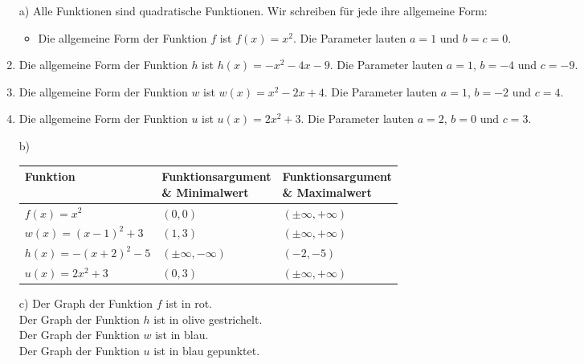 \documentclass[12pt]{article}
\begin{document}
\begin{solution}
\begin{enumerate}
\item[a)] Alle Funktionen sind quadratische Funktionen. Wir schreiben für jede ihre allgemeine Form:
\begin{itemize}
\item Die allgemeine Form der Funktion $f$ ist $f(x)=x^{2}$. Die Parameter lauten $a=1$ und $b=c=0$. \\
\end{itemize} 
\item Die allgemeine Form der Funktion $h$ ist $h(x) = -x^{2}-4x-9$. Die Parameter lauten  $a=1$, $b=-4$ und $c=-9$. \\
\item Die allgemeine Form der Funktion $w$ ist $w(x)=x^{2}-2x+4$. Die Parameter lauten $a=1$, $b=-2$ und $c=4$. \\
\item Die allgemeine Form der Funktion $u$ ist $u(x)=2x^{2}+3$. Die Parameter lauten $a=2$, $b=0$ und $c=3$. \\
\item[b)] 
\begin{center}
\footnotesize
\begin{tabularx}{\linewidth}{|l|X|X|}
\toprule
Funktion & \makecell{ Funktionsargument \\  \& Minimalwert} & \makecell{  Funktionsargument \\  \& Maximalwert} \\
\midrule
$f(x) = x^2$ & $(0,0)$& $(\pm \infty, +\infty)$  \\
\hline
$w(x) = (x-1)^2 + 3$ & $(1,3)$ & $(\pm \infty, +\infty)$\\
\hline
$h(x) = -(x+2)^2 - 5$ & $(\pm \infty, -\infty)$  & $(-2,-5)$\\
\hline
$u(x) = 2x^2 + 3$ & $(0,3)$ & $(\pm \infty, +\infty)$ \\
\bottomrule
\end{tabularx}
\end{center}
\item[c)] \textbullet{} Der Graph der Funktion $f$ ist in rot. \\
\textbullet{} Der Graph der Funktion $h$ ist in olive gestrichelt. \\
\textbullet{} Der Graph der Funktion $w$ ist in blau. \\
\textbullet{} Der Graph der Funktion $u$ ist in blau gepunktet. \\
\end{enumerate}
\end{solution}
\end{document}
